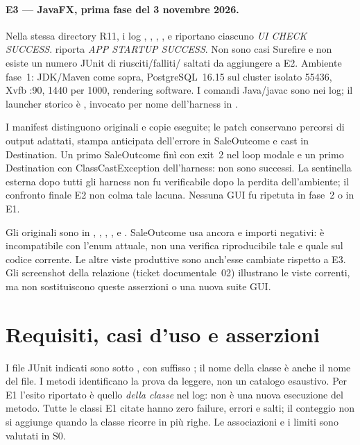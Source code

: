 \paragraph{E3 --- JavaFX, prima fase del 3 novembre 2026.}
Nella stessa directory R11, i log ,
, ,
,  e
 riportano ciascuno \emph{UI CHECK SUCCESS}.
 riporta \emph{APP STARTUP SUCCESS}.
Non sono casi Surefire e non esiste un numero JUnit di riusciti/falliti/
saltati da aggiungere a E2. Ambiente fase~1: JDK/Maven come sopra,
PostgreSQL~16.15 sul cluster isolato 55436, Xvfb :90, 1440 per 1000,
rendering software. I comandi Java/javac sono nei log; il launcher
storico è , invocato per nome dell'harness in
.

I manifest  distinguono originali e copie eseguite;
le patch conservano percorsi di output adattati, stampa anticipata
dell'errore in SaleOutcome e cast  in Destination.
Un primo SaleOutcome finì con exit~2 nel loop modale e un primo
Destination con ClassCastException dell'harness: non sono successi.
La sentinella esterna dopo tutti gli harness non fu verificabile dopo
la perdita dell'ambiente; il confronto finale E2 non colma tale lacuna.
Nessuna GUI fu ripetuta in fase~2 o in E1.

Gli originali sono in ,
, , ,
 e . SaleOutcome usa ancora
 e importi negativi: è incompatibile con
l'enum attuale, non una verifica riproducibile tale e quale sul codice
corrente. Le altre viste produttive sono anch'esse cambiate rispetto a E3.
Gli screenshot della relazione (ticket documentale~02) illustrano le viste
correnti, ma non sostituiscono queste asserzioni o una nuova suite GUI.

\section{Requisiti, casi d'uso e asserzioni}\label{sec:matrice-uc}
I file JUnit indicati sono sotto ,
con suffisso ; il nome della classe è anche il nome del file.
I metodi identificano la prova da leggere, non un catalogo esaustivo.
Per E1 l'esito riportato è quello \emph{della classe} nel log: non è una
nuova esecuzione del metodo. Tutte le classi E1 citate hanno zero failure,
errori e salti; il conteggio non si aggiunge quando la classe ricorre in
più righe. Le associazioni e i limiti sono valutati in S0.

